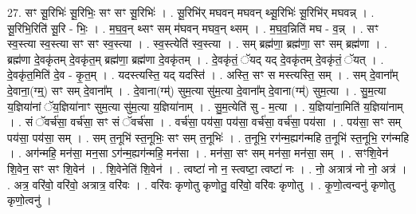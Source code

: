 \documentclass[17pt]{extarticle}
\begin{document}
27. सꣳ सू॒रिभिः॑ सू॒रिभिः॒ सꣳ सꣳ सू॒रिभिः॑ । . सू॒रिभि॑र् मघवन् मघवन् थ्सू॒रिभिः॑ सू॒रिभि॑र् मघवन्न् । . सू॒रिभि॒रिति॑ सू॒रि - भिः॒ । . म॒घ॒व॒न् थ्सꣳ सम् म॑घवन् मघव॒न् थ्सम् । . म॒घ॒व॒न्निति॑ मघ - व॒न्न् । . सꣳ स्व॒स्त्या स्व॒स्त्या सꣳ सꣳ स्व॒स्त्या । . स्व॒स्त्येति॑ स्व॒स्त्या । . सम् ब्रह्म॑णा॒ ब्रह्म॑णा॒ सꣳ सम् ब्रह्म॑णा । . ब्रह्म॑णा दे॒वकृ॑तम् दे॒वकृ॑त॒म् ब्रह्म॑णा॒ ब्रह्म॑णा दे॒वकृ॑तम् । . दे॒वकृ॑तं॒ ॅयद् यद् दे॒वकृ॑तम् दे॒वकृ॑तं॒ ॅयत् । . दे॒वकृ॑त॒मिति॑ दे॒व - कृ॒त॒म् । . यदस्त्यस्ति॒ यद् यदस्ति॑ । . अस्ति॒ सꣳ स मस्त्यस्ति॒ सम् । . सम् दे॒वाना᳚म् दे॒वाना॒(ग्म्॒) सꣳ सम् दे॒वाना᳚म् । . दे॒वाना(ग्म्॑) सुम॒त्या सु॑म॒त्या दे॒वाना᳚म् दे॒वाना(ग्म्॑) सुम॒त्या । . सु॒म॒त्या य॒ज्ञिया॑नां ॅय॒ज्ञिया॑नाꣳ सुम॒त्या सु॑म॒त्या य॒ज्ञिया॑नाम् । . सु॒म॒त्येति॑ सु - म॒त्या । . य॒ज्ञिया॑ना॒मिति॑ य॒ज्ञिया॑नाम् । . सं ॅवर्च॑सा॒ वर्च॑सा॒ सꣳ सं ॅवर्च॑सा । . वर्च॑सा॒ पय॑सा॒ पय॑सा॒ वर्च॑सा॒ वर्च॑सा॒ पय॑सा । . पय॑सा॒ सꣳ सम् पय॑सा॒ पय॑सा॒ सम् । . सम् त॒नूभि॑ स्त॒नूभिः॒ सꣳ सम् त॒नूभिः॑ । . त॒नूभि॒ रग॑न्म॒ह्यग॑न्महि त॒नूभि॑ स्त॒नूभि॒ रग॑न्महि । . अग॑न्महि॒ मन॑सा॒ मन॒सा ऽग॑न्म॒ह्यग॑न्महि॒ मन॑सा । . मन॑सा॒ सꣳ सम् मन॑सा॒ मन॑सा॒ सम् । . सꣳशि॒वेन॑ शि॒वेन॒ सꣳ सꣳ शि॒वेन॑ । . शि॒वेनेति॑ शि॒वेन॑ । . त्वष्टा॑ नो न॒ स्त्वष्टा॒ त्वष्टा॑ नः । . नो॒ अत्रात्र॑ नो नो॒ अत्र॑ । . अत्र॒ वरि॑वो॒ वरि॑वो॒ अत्रात्र॒ वरि॑वः । . वरि॑वः कृणोतु कृणोतु॒ वरि॑वो॒ वरि॑वः कृणोतु । . कृ॒णो॒त्वन्वनु॑ कृणोतु कृणो॒त्वनु॑ । \newline
\end{document}
